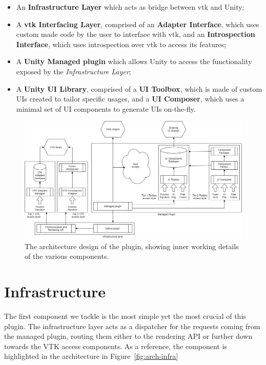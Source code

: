 \begin{itemize}
    \item An \textbf{Infrastructure Layer} which acts as bridge between \acrshort{vtk} and Unity;
    \item A \textbf{\acrshort{vtk} Interfacing Layer}, comprised of an \textbf{Adapter Interface}, which uses custom made code by the user to interface with \acrshort{vtk}, and an \textbf{Introspection Interface}, which uses introspection over \acrshort{vtk} to access its features;
    \item A \textbf{Unity Managed plugin} which allows Unity to access the functionality exposed by the \textit{Infrastructure Layer};
    \item A \textbf{Unity UI Library}, comprised of a \textbf{UI Toolbox}, which is made of custom UIs created to tailor specific usages, and a \textbf{UI Composer}, which uses a minimal set of UI components to generate UIs on-the-fly.
\end{itemize}

\begin{figure}[!t]
    \centering
    \includegraphics[width=\textwidth]{pictures/Architecture-v0.3.png}
    \caption{The architecture design of the plugin, showing inner working details of the various components.}
    \label{fig:high-level-architecture}
\end{figure}

\section{Infrastructure}
\label{sec:design-infrastructure}

The first component we tackle is the most simple yet the most crucial of this plugin. The infrastructure layer acts as a dispatcher for the requests coming from the managed plugin, routing them either to the rendering API or further down towards the VTK access components. As a reference, the component is highlighted in the architecture in Figure~\ref{fig:arch-infra}

